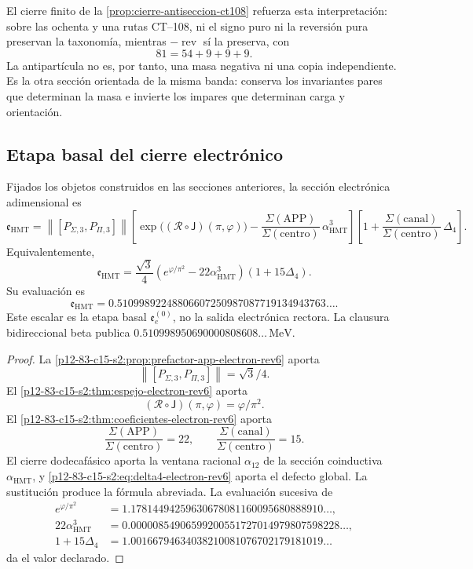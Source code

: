 El cierre finito de la \cref{prop:cierre-antiseccion-ct108} refuerza esta
interpretación: sobre las ochenta y una rutas CT--108, ni el signo puro ni
la reversión pura preservan la taxonomía, mientras
\(-\operatorname{rev}\) sí la preserva, con
\[
 81=54+9+9+9.
\]
La antipartícula no es, por tanto, una masa negativa ni una copia
independiente. Es la otra sección orientada de la misma banda: conserva los
invariantes pares que determinan la masa e invierte los impares que
determinan carga y orientación.

\subsection{Etapa basal del cierre electrónico}

\begin{theorem}
\label{p12-83-c15-s2:thm:cierre-electron-holografico-rev6}
Fijados los objetos construidos en las secciones anteriores, la sección
electrónica adimensional es
\[
 \mathfrak e_{\mathrm{HMT}}
 =
 \left\|[P_{\Sigma,3},P_{\Pi,3}]\right\|
 \left[
 \exp\bigl((\mathscr R\circ\mathsf J)(\pi,\varphi)\bigr)
 -\frac{\Sigma(\mathrm{APP})}
 {\Sigma(\mathrm{centro})}\,
 \alpha_{\mathrm{HMT}}^3
 \right]
 \left[
 1+
 \frac{\Sigma(\mathrm{canal})}
 {\Sigma(\mathrm{centro})}\,
 \Delta_4
 \right].
\]
Equivalentemente,
\[
 \boxed{
 \mathfrak e_{\mathrm{HMT}}
 =
 \frac{\sqrt3}{4}
 \left(e^{\varphi/\pi^2}
 -22\alpha_{\mathrm{HMT}}^3\right)
 (1+15\Delta_4).}
\]
Su evaluación es
\[
 \boxed{
 \mathfrak e_{\mathrm{HMT}}
 =
 0.51099892248806607250987087719134943763\ldots.}
\]
Este escalar es la etapa basal \(\mathfrak e_e^{(0)}\), no la salida
electrónica rectora. La clausura bidireccional beta publica
\(0.510998950690000808608\ldots\,\mathrm{MeV}\).
\end{theorem}

\begin{proof}
La \cref{p12-83-c15-s2:prop:prefactor-app-electron-rev6} aporta
\[
 \left\|[P_{\Sigma,3},P_{\Pi,3}]\right\|=\sqrt3/4.
\]
El \cref{p12-83-c15-s2:thm:espejo-electron-rev6} aporta
\[
 (\mathscr R\circ\mathsf J)(\pi,\varphi)=\varphi/\pi^2.
\]
El \cref{p12-83-c15-s2:thm:coeficientes-electron-rev6} aporta
\[
 \frac{\Sigma(\mathrm{APP})}{\Sigma(\mathrm{centro})}=22,
 \qquad
 \frac{\Sigma(\mathrm{canal})}{\Sigma(\mathrm{centro})}=15.
\]
El cierre dodecafásico aporta la ventana racional \(\alpha_{12}\) de la
sección coinductiva \(\alpha_{\mathrm{HMT}}\), y
\cref{p12-83-c15-s2:eq:delta4-electron-rev6} aporta el defecto global. La sustitución
produce la fórmula abreviada. La evaluación sucesiva de
\[
\begin{aligned}
 e^{\varphi/\pi^2}
 &=1.17814494259630678081160095680888910\ldots,\\
 22\alpha_{\mathrm{HMT}}^3
 &=0.00000854906599200551727014979807598228\ldots,\\
 1+15\Delta_4
 &=1.00166794634038210081076702179181019\ldots
\end{aligned}
\]
da el valor declarado.
\end{proof}

